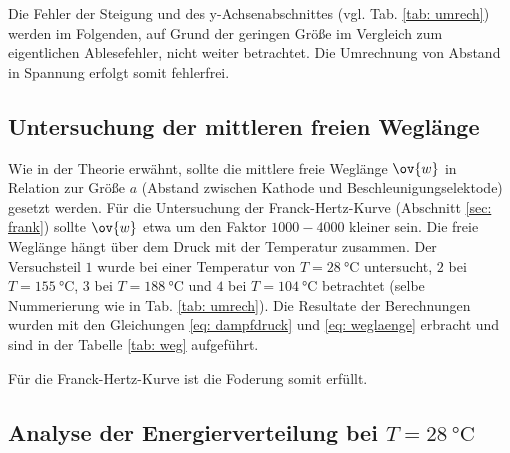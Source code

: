 Die Fehler der Steigung und des y-Achsenabschnittes (vgl. Tab. \ref{tab: umrech}) werden
im Folgenden, auf Grund der geringen Größe im Vergleich zum eigentlichen Ablesefehler, nicht weiter betrachtet.
Die Umrechnung von Abstand in Spannung erfolgt somit fehlerfrei.
\FloatBarrier

\subsection{Untersuchung der mittleren freien Weglänge}
\FloatBarrier
Wie in der Theorie erwähnt, sollte die mittlere freie Weglänge $\ov{w}$ in Relation zur Größe $a$
(Abstand zwischen Kathode und Beschleunigungselektode) gesetzt werden. Für die Untersuchung der Franck-Hertz-Kurve (Abschnitt \ref{sec: frank})
sollte $\ov{w}$ etwa um den Faktor $1000-4000$ kleiner sein. Die freie Weglänge hängt über dem Druck mit der Temperatur zusammen.
Der Versuchsteil $1$ wurde bei einer Temperatur von $T=\SI{28}{\celsius}$ untersucht, $2$ bei $T=\SI{155}{\celsius}$,
$3$ bei $T=\SI{188}{\celsius}$ und $4$ bei $T=\SI{104}{\celsius}$ betrachtet (selbe Nummerierung wie in Tab. \ref{tab: umrech}).
Die Resultate der Berechnungen wurden mit den Gleichungen \eqref{eq: dampfdruck} und \eqref{eq: weglaenge} erbracht und
sind in der Tabelle \ref{tab: weg} aufgeführt.

Für die Franck-Hertz-Kurve ist die Foderung somit erfüllt.

\subsection{Analyse der Energierverteilung bei $T=\SI{28}{\celsius}$}

